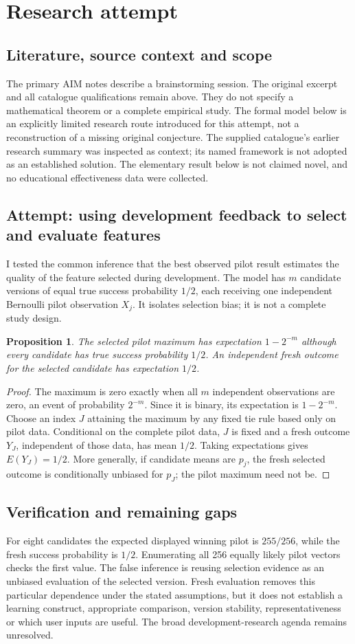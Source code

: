 \documentclass[11pt]{article}
\newtheorem{proposition}{Proposition}
\begin{document}
\section{Research attempt}
\subsection{Literature, source context and scope}
The primary AIM notes describe a brainstorming session. The original excerpt and all catalogue qualifications remain above. They do not specify a mathematical theorem or a complete empirical study. The formal model below is an explicitly limited research route introduced for this attempt, not a reconstruction of a missing original conjecture. The supplied catalogue's earlier research summary was inspected as context; its named framework is not adopted as an established solution. The elementary result below is not claimed novel, and no educational effectiveness data were collected.

\subsection{Attempt: using development feedback to select and evaluate features}
I tested the common inference that the best observed pilot result estimates the quality of the feature selected during development. The model has $m$ candidate versions of equal true success probability $1/2$, each receiving one independent Bernoulli pilot observation $X_j$. It isolates selection bias; it is not a complete study design.
\begin{proposition}
The selected pilot maximum has expectation $1-2^{-m}$ although every candidate has true success probability $1/2$. An independent fresh outcome for the selected candidate has expectation $1/2$.
\end{proposition}
\begin{proof}
The maximum is zero exactly when all $m$ independent observations are zero, an event of probability $2^{-m}$. Since it is binary, its expectation is $1-2^{-m}$. Choose an index $J$ attaining the maximum by any fixed tie rule based only on pilot data. Conditional on the complete pilot data, $J$ is fixed and a fresh outcome $Y_J$, independent of those data, has mean $1/2$. Taking expectations gives $E(Y_J)=1/2$. More generally, if candidate means are $p_j$, the fresh selected outcome is conditionally unbiased for $p_J$; the pilot maximum need not be.
\end{proof}
\subsection{Verification and remaining gaps}
For eight candidates the expected displayed winning pilot is $255/256$, while the fresh success probability is $1/2$. Enumerating all 256 equally likely pilot vectors checks the first value. The false inference is reusing selection evidence as an unbiased evaluation of the selected version. Fresh evaluation removes this particular dependence under the stated assumptions, but it does not establish a learning construct, appropriate comparison, version stability, representativeness or which user inputs are useful. The broad development-research agenda remains unresolved.
\end{document}
